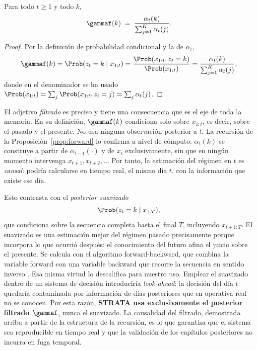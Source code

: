 \begin{proposicion}
\label{prop:filtrado}
Para todo $t \ge 1$ y todo $k$,
\[
\gammaf(k) \;=\; \frac{\alpha_t(k)}{\sum_{j=1}^{K} \alpha_t(j)}.
\]
\end{proposicion}

\begin{proof}
Por la definición de probabilidad condicional y la de $\alpha_t$,
\[
\gammaf(k) = \Prob(z_t = k \mid x_{1:t})
= \frac{\Prob(x_{1:t}, z_t = k)}{\Prob(x_{1:t})}
= \frac{\alpha_t(k)}{\sum_{j=1}^{K} \alpha_t(j)},
\]
donde en el denominador se ha usado $\Prob(x_{1:t}) = \sum_j \Prob(x_{1:t}, z_t = j) = \sum_j \alpha_t(j)$.
\end{proof}

El adjetivo \emph{filtrado} es preciso y tiene una consecuencia que es el eje de toda la memoria. En su definición, $\gammaf(k)$ condiciona solo sobre $x_{1:t}$, es decir, sobre el pasado y el presente. No usa ninguna observación posterior a $t$. La recursión de la Proposición~\ref{prop:forward} lo confirma a nivel de cómputo: $\alpha_t(k)$ se construye a partir de $\alpha_{t-1}(\cdot)$ y de $x_t$ exclusivamente, sin que en ningún momento intervenga $x_{t+1}, x_{t+2}, \dots$ Por tanto, la estimación del régimen en $t$ es \emph{causal}: podría calcularse en tiempo real, el mismo día $t$, con la información que existe ese día.

Esto contrasta con el \emph{posterior suavizado}
\[
\Prob(z_t = k \mid x_{1:T}),
\]
que condiciona sobre la secuencia completa hasta el final $T$, incluyendo $x_{t+1:T}$. El suavizado es una estimación mejor del régimen pasado precisamente porque incorpora lo que ocurrió después: el conocimiento del futuro afina el juicio sobre el presente. Se calcula con el algoritmo forward-backward, que combina la variable forward con una variable backward que recorre la secuencia en sentido inverso \cite{baum1970, rabiner1989}. Esa misma virtud lo descalifica para nuestro uso. Emplear el suavizado dentro de un sistema de decisión introduciría \emph{look-ahead}: la decisión del día $t$ quedaría contaminada por información de días posteriores que en operativa real no se conocen. Por esta razón, \textbf{STRATA usa exclusivamente el posterior filtrado $\gammaf$}, nunca el suavizado. La causalidad del filtrado, demostrada arriba a partir de la estructura de la recursión, es lo que garantiza que el sistema sea reproducible en tiempo real y que la validación de los capítulos posteriores no incurra en fuga temporal.

